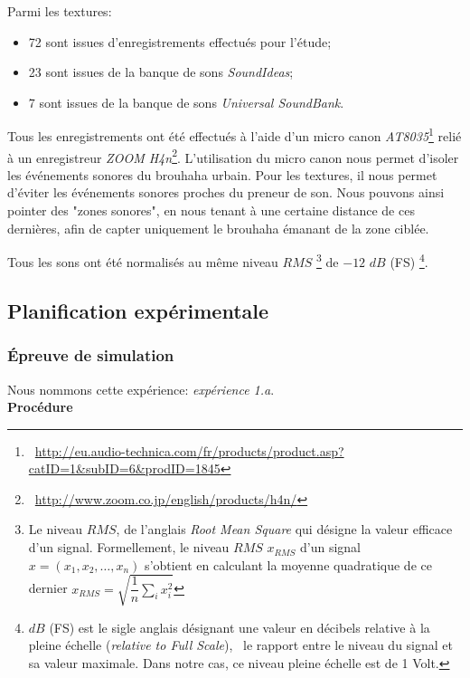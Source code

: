 Parmi les textures:

\begin{itemize}
\item 72 sont issues d’enregistrements effectués pour l'étude;
\item 23 sont issues de la banque de sons \emph{SoundIdeas};
\item 7 sont issues de la banque de sons \emph{Universal SoundBank}.
\end{itemize}

Tous les enregistrements ont été effectués à l’aide d'un micro canon \emph{AT8035}\footnote{\cf~\url{http://eu.audio-technica.com/fr/products/product.asp?catID=1&subID=6&prodID=1845}} relié à un enregistreur \emph{ZOOM H4n}\footnote{\cf~\url{http://www.zoom.co.jp/english/products/h4n/}}. L’utilisation du micro canon nous permet d’isoler les événements sonores du brouhaha urbain. Pour les textures, il nous permet d’éviter les événements sonores proches du preneur de son. Nous pouvons ainsi pointer des "zones sonores", en nous tenant à une certaine distance de ces dernières, afin de capter uniquement le brouhaha émanant de la zone ciblée.

Tous les sons ont été normalisés au même niveau $RMS$ \footnote{Le niveau $RMS$, de l'anglais \emph{Root Mean Square} qui désigne la valeur efficace d'un signal. Formellement, le niveau $RMS$ $x_{RMS}$ d'un signal $x=(x_1,x_2,\ldots,x_n)$ s'obtient en calculant la moyenne quadratique de ce dernier $x_{RMS}=\sqrt{\dfrac{1}{n}\sum\limits_{i} x_i^2}$} de $-12$ $dB$ (FS) \footnote{$dB$ (FS) est le sigle anglais désignant une valeur en décibels relative à la pleine échelle (\emph{relative to Full Scale}), \ie~le rapport entre le niveau du signal et sa valeur maximale. Dans notre cas, ce niveau pleine échelle est de 1 Volt.}.

\subsection{Planification expérimentale}

\subsubsection{Épreuve de simulation}
\label{sec:ch5_planExpSimu}

Nous nommons cette expérience: \emph{expérience 1.a}. \\

\textbf{Procédure} \\

